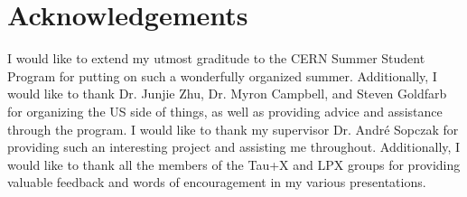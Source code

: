 \section{Acknowledgements}
    I would like to extend my utmost graditude to the CERN Summer Student Program for putting on such a wonderfully organized summer. Additionally, I would like to thank Dr. Junjie Zhu, Dr. Myron Campbell, and Steven Goldfarb for organizing the US side of things, as well as providing advice and assistance through the program. I would like to thank my supervisor Dr. Andr\'e Sopczak for providing such an interesting project and assisting me throughout. Additionally, I would like to thank all the members of the Tau+X and LPX groups for providing valuable feedback and words of encouragement in my various presentations.